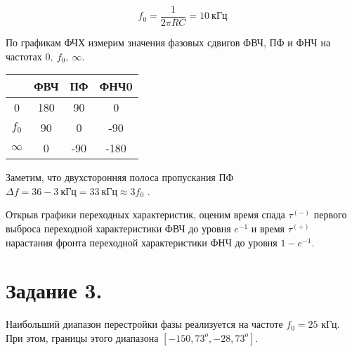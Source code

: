 	\begin{equation*}
		f_0 = \frac{1}{2 \pi RC} = 10 ~ \text{кГц}
	\end{equation*}

	\noindent По графикам ФЧХ измерим значения фазовых
	сдвигов ФВЧ, ПФ и ФНЧ на частотах $0, ~ f_0, ~ \infty$.

	\begin{table}[h!]
		\begin{center}
			\begin{tabular}{|c|c|c|c|}
				\hline
							& ФВЧ & ПФ  & ФНЧ0 \\ \hline
				0       	& 180 & 90  & 0    \\ \hline
				$f_0$   	& 90  & 0   & -90  \\ \hline
				$\infty$	& 0   & -90 & -180 \\ \hline
			\end{tabular}
		\end{center}
	\end{table}

	\noindent Заметим, что двухсторонняя полоса пропускания ПФ $\Delta f = 36 - 3 ~ \text{кГц} = 33 ~ \text{кГц} \approx 3f_0$ .
	\vspace*{5mm}

	\noindent Открыв графики переходных характеристик, оценим время спада $\tau^{(-)}$ первого выброса
	переходной характеристики ФВЧ до уровня $e^{-1}$ и время $\tau^{(+)}$ нарастания фронта переходной
	характеристики ФНЧ до уровня $1 - e^{-1}$.

	\begin{center}
	\end{center}

	\begin{center}
	\end{center}


	\section*{Задание 3.}

	\noindent Наибольший диапазон перестройки фазы реализуется на частоте $f_0 = 25$ кГц. При этом, границы этого диапазона
	$[-150, 73^o, -28,73^o]$.
	\vspace*{5mm}

